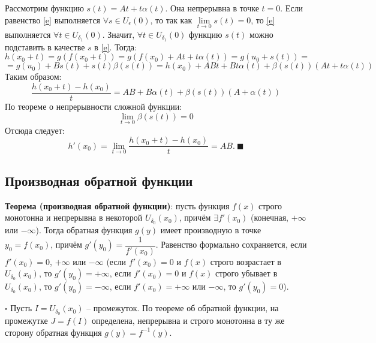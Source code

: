 \documentclass[12pt, a4paper, reqno]{article}
\begin{document}
    Рассмотрим функцию $s(t) = At + t\alpha(t)$. Она непрерывна в точке $t = 0$. Если равенство
    \eqref{e} выполняется $\forall s\in U_{\epsilon}(0)$, то так как $\lim\limits_{t\to 0} s(t) = 0$,
    то \eqref{e} выполняется $\forall t\in U_{\delta_1}(0)$. Значит, $\forall t\in U_{\delta_1}(0)$
    функцию $s(t)$ можно подставить в качестве $s$ в \eqref{e}. Тогда:
    \begin{equation*}
        h(x_0 + t) = g(f(x_0 + t)) = g(f(x_0) + At + t\alpha(t)) = g(u_0 + s(t)) =
    \end{equation*}
    \begin{equation*}
        = g(u_0) + Bs(t) + s(t)\beta(s(t)) = h(x_0) + ABt + Bt\alpha(t) +
        \beta(s(t))(At + t\alpha(t))
    \end{equation*}
    Таким образом:
    \begin{equation*}
        \dfrac{h(x_0 + t) - h(x_0)}{t} = AB + B\alpha(t) + \beta(s(t))(A + \alpha(t))
    \end{equation*}
    По теореме о непрерывности сложной функции:
    \begin{equation*}
        \lim\limits_{t\to 0} \beta(s(t)) = 0
    \end{equation*}
    Отсюда следует:
    \begin{equation*}
        h'(x_0) = \lim\limits_{t\to 0} \dfrac{h(x_0 + t) - h(x_0)}{t} = AB.\ \blacksquare
    \end{equation*}

\subsection{Производная обратной функции}

    \textbf{Теорема (производная  обратной функции)}: пусть функция $f(x)$ строго монотонна и
    непрерывна в некоторой $U_{\delta_0}(x_0)$, причём $\exists f'(x_0)$ (конечная, $+\infty$ или
    $-\infty$). Тогда обратная функция $g(y)$ имеет производную в точке $y_0 = f(x_0)$, причём
    $g'(y_0) = \dfrac{1}{f'(x_0)}$. Равенство формально сохраняется, если $f'(x_0) = 0$, $+\infty$
    или $-\infty$ (если $f'(x_0) = 0$ и $f(x)$ строго возрастает в $U_{\delta_0}(x_0)$, то
    $g'(y_0) = +\infty$, если $f'(x_0) = 0$ и $f(x)$ строго убывает в $U_{\delta_0}(x_0)$, то
    $g'(y_0) = -\infty$, если $f'(x_0) = +\infty$ или $-\infty$, то $g'(y_0) = 0$).

    $\square$ Пусть $I = U_{\delta_0}(x_0)$ -- промежуток. По теореме об обратной функции, на
    промежутке $J = f(I)$ определена, непрерывна и строго монотонна в ту же сторону обратная
    функция $g(y) = f^{-1}(y)$.
\end{document}
